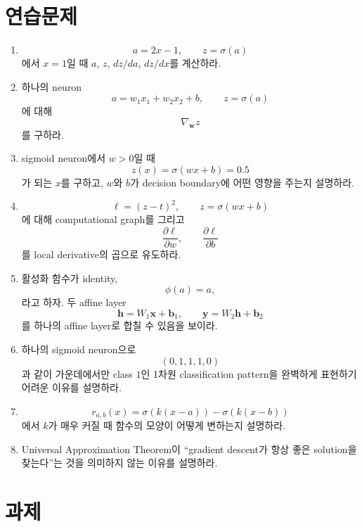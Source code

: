 \documentclass[11pt,a4paper]{article}
\newcommand{\vect}[1]{\bm{#1}}
\newcommand{\sigmoid}{\sigma}
\begin{document}
\section{연습문제}

\begin{enumerate}[label=\arabic*.]

\item
\[
a=2x-1,
\qquad
z=\sigmoid(a)
\]
에서 $x=1$일 때 $a$, $z$, $dz/da$, $dz/dx$를 계산하라.

\item 하나의 neuron
\[
a=w_1x_1+w_2x_2+b,
\qquad
z=\sigmoid(a)
\]
에 대해
\[
\nabla_{\vect{w}}z
\]
를 구하라.

\item sigmoid neuron에서 $w>0$일 때
\[
z(x)=\sigmoid(wx+b)=0.5
\]
가 되는 $x$를 구하고, $w$와 $b$가 decision boundary에 어떤 영향을 주는지 설명하라.

\item
\[
\ell=(z-t)^2,\qquad
z=\sigmoid(wx+b)
\]
에 대해 computational graph를 그리고
\[
\frac{\partial\ell}{\partial w},
\qquad
\frac{\partial\ell}{\partial b}
\]
를 local derivative의 곱으로 유도하라.

\item 활성화 함수가 identity,
\[
\phi(a)=a,
\]
라고 하자. 두 affine layer
\[
\vect{h}=W_1\vect{x}+\vect{b}_1,
\qquad
\vect{y}=W_2\vect{h}+\vect{b}_2
\]
를 하나의 affine layer로 합칠 수 있음을 보이라.

\item 하나의 sigmoid neuron으로
\[
(0,1,1,1,0)
\]
과 같이 가운데에서만 class $1$인 1차원 classification pattern을 완벽하게 표현하기 어려운 이유를 설명하라.

\item
\[
r_{a,b}(x)
=
\sigmoid(k(x-a))-\sigmoid(k(x-b))
\]
에서 $k$가 매우 커질 때 함수의 모양이 어떻게 변하는지 설명하라.

\item Universal Approximation Theorem이
``gradient descent가 항상 좋은 solution을 찾는다''는 것을 의미하지 않는 이유를 설명하라.

\end{enumerate}

\section{과제}
\end{document}
